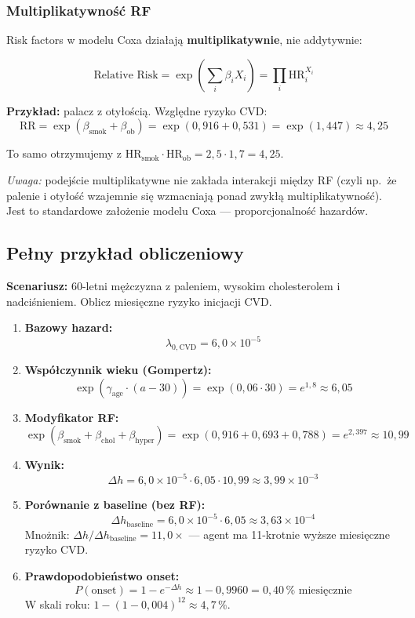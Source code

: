 \documentclass[11pt,a4paper]{article}
\newcommand{\baseh}{\lambda}                       %
\begin{document}
\subsubsection{Multiplikatywność RF}

Risk factors w modelu Coxa działają \textbf{multiplikatywnie}, nie addytywnie:

\begin{formulabox}
\[
\text{Relative Risk} = \exp\left(\sum_i \beta_i X_i\right) = \prod_i \mathrm{HR}_i^{X_i}
\]
\end{formulabox}

\textbf{Przykład:} palacz z otyłością. Względne ryzyko CVD:
\[
\text{RR} = \exp(\beta_{\text{smok}} + \beta_{\text{ob}}) = \exp(0{,}916 + 0{,}531) = \exp(1{,}447) \approx 4{,}25
\]

To samo otrzymujemy z $\mathrm{HR}_{\text{smok}} \cdot \mathrm{HR}_{\text{ob}} = 2{,}5 \cdot 1{,}7 = 4{,}25$.

\emph{Uwaga:} podejście multiplikatywne nie zakłada interakcji między RF (czyli np.\ że palenie i otyłość wzajemnie się wzmacniają ponad zwykłą multiplikatywność). Jest to standardowe założenie modelu Coxa --- proporcjonalność hazardów.

\subsection{Pełny przykład obliczeniowy}

\textbf{Scenariusz:} 60-letni mężczyzna z paleniem, wysokim cholesterolem i nadciśnieniem. Oblicz miesięczne ryzyko inicjacji CVD.

\begin{enumerate}[leftmargin=*, itemsep=6pt]
  \item \textbf{Bazowy hazard:}
  \[
  \baseh_{0,\text{CVD}} = 6{,}0 \times 10^{-5}
  \]

  \item \textbf{Współczynnik wieku (Gompertz):}
  \[
  \exp(\gamma_{\text{age}} \cdot (a - 30)) = \exp(0{,}06 \cdot 30) = e^{1{,}8} \approx 6{,}05
  \]

  \item \textbf{Modyfikator RF:}
  \[
  \exp(\beta_{\text{smok}} + \beta_{\text{chol}} + \beta_{\text{hyper}}) = \exp(0{,}916 + 0{,}693 + 0{,}788) = e^{2{,}397} \approx 10{,}99
  \]

  \item \textbf{Wynik:}
  \[
  \Delta h = 6{,}0 \times 10^{-5} \cdot 6{,}05 \cdot 10{,}99 \approx 3{,}99 \times 10^{-3}
  \]

  \item \textbf{Porównanie z baseline (bez RF):}
  \[
  \Delta h_{\text{baseline}} = 6{,}0 \times 10^{-5} \cdot 6{,}05 \approx 3{,}63 \times 10^{-4}
  \]
  Mnożnik: $\Delta h / \Delta h_{\text{baseline}} = 11{,}0\times$ --- agent ma 11-krotnie wyższe miesięczne ryzyko CVD.

  \item \textbf{Prawdopodobieństwo onset:}
  \[
  P(\text{onset}) = 1 - e^{-\Delta h} \approx 1 - 0{,}9960 = 0{,}40\,\% \text{ miesięcznie}
  \]
  W skali roku: $1 - (1 - 0{,}004)^{12} \approx 4{,}7\,\%$.
\end{enumerate}
\end{document}
